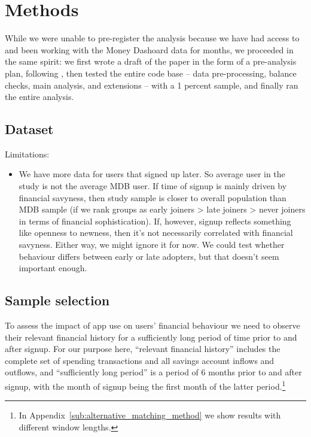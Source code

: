 
\section{Methods}%
\label{sec:data}

While we were unable to pre-register the analysis because we have had access to
and been working with the Money Dashoard data for months, we proceeded in the
same spirit: we first wrote a draft of the paper in the form of a pre-analysis
plan, following \citet{olken2015promises}, then tested the entire code base --
data pre-processing, balance checks, main analysis, and extensions -- with a 1
percent sample, and finally ran the entire analysis.


\subsection{Dataset}%
\label{sub:dataset}

Limitations:
\begin{itemize}
    \item We have more data for users that signed up later. So average user in
        the study is not the average MDB user. If time of signup is mainly
        driven by financial savyness, then study sample is closer to overall
        population than MDB sample (if we rank groups as early joiners > late
        joiners > never joiners in terms of financial sophistication). If,
        however, signup reflects something like openness to newness, then it's
        not necessarily correlated with financial savyness. Either way, we
        might ignore it for now. We could test whether behaviour differs
        between early or late adopters, but that doesn't seem important enough.
\end{itemize}


\subsection{Sample selection}%
\label{sub:sample_selection}

To assess the impact of app use on users' financial behaviour we need to
observe their relevant financial history for a sufficiently long period of time
prior to and after signup. For our purpose here, ``relevant
financial history'' includes the complete set of spending transactions and all
savings account inflows and outflows, and ``sufficiently long period'' is a
period of 6 months prior to and after signup, with the month of signup being
the first month of the latter period.\footnote{In
Appendix~\ref{sub:alternative_matching_method} we show results with different
window lengths. }

